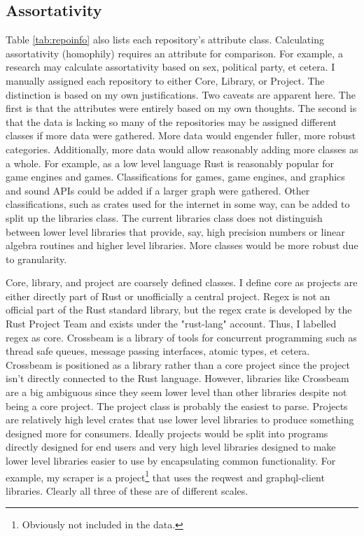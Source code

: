 \documentclass[12pt, a4paper]{article}
\begin{document}
\subsection{Assortativity}
Table \ref{tab:repoinfo} also lists each repository's attribute class. Calculating assortativity (homophily) requires an attribute for comparison. For example, a research may calculate assortativity based on sex, political party, et cetera. I manually assigned each repository to either Core, Library, or Project. The distinction is based on my own justifications. Two caveats are apparent here. The first is that the attributes were entirely based on my own thoughts. The second is that the data is lacking so many of the repositories may be assigned different classes if more data were gathered. More data would engender fuller, more robust categories. Additionally, more data would allow reasonably adding more classes as a whole. For example, as a low level language Rust is reasonably popular for game engines and games. Classifications for games, game engines, and graphics and sound APIs could be added if a larger graph were gathered. Other classifications, such as crates used for the internet in some way, can be added to split up the libraries class. The current libraries class does not distinguish between lower level libraries that provide, say, high precision numbers or linear algebra routines and higher level libraries. More classes would be more robust due to granularity.

Core, library, and project are coarsely defined classes. I define core as projects are either directly part of Rust or unofficially a central project. Regex is not an official part of the Rust standard library, but the regex crate is developed by the Rust Project Team and exists under the "rust-lang" account. Thus, I labelled regex as core. Crossbeam is a library of tools for concurrent programming such as thread safe queues, message passing interfaces, atomic types, et cetera. Crossbeam is positioned as a library rather than a core project since the project isn't directly connected to the Rust language. However, libraries like Crossbeam are a big ambiguous since they seem lower level than other libraries despite not being a core project. The project class is probably the easiest to parse. Projects are relatively high level crates that use lower level libraries to produce something designed more for consumers. Ideally projects would be split into programs directly designed for end users and very high level libraries designed to make lower level libraries easier to use by encapsulating common functionality. For example, my scraper is a project\footnote{Obviously not included in the data.} that uses the reqwest and graphql-client libraries. Clearly all three of these are of different scales.
\end{document}
